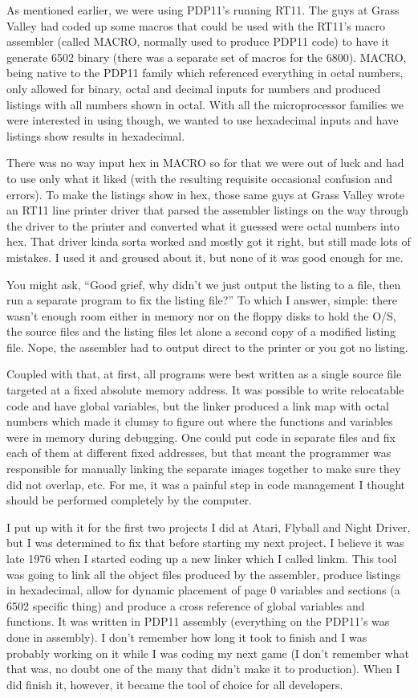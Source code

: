 As mentioned earlier, we were using PDP11's running RT11. The guys at Grass Valley had coded up some macros that could be used with the RT11's macro assembler (called MACRO, normally used to produce PDP11 code) to have it generate 6502 binary (there was a separate set of macros for the 6800). MACRO, being native to the PDP11 family which referenced everything in octal numbers, only allowed for binary, octal and decimal inputs for numbers and produced listings with all numbers shown in octal. With all the microprocessor families we were interested in using though, we wanted to use hexadecimal inputs and have listings show results in hexadecimal. 

There was no way input hex in MACRO so for that we were out of luck and had to use only what it liked (with the resulting requisite occasional confusion and errors). To make the listings show in hex, those same guys at Grass Valley wrote an RT11 line printer driver that parsed the assembler listings on the way through the driver to the printer and converted what it guessed were octal numbers into hex. That driver kinda sorta worked and mostly got it right, but still made lots of mistakes. I used it and groused about it, but none of it was good enough for me. 

You might ask, “Good grief, why didn't we just output the listing to a file, then run a separate program to fix the listing file?” To which I answer, simple: there wasn't enough room either in memory nor on the floppy disks to hold the O/S, the source files and the listing files let alone a second copy of a modified listing file. Nope, the assembler had to output direct to the printer or you got no listing. 

Coupled with that, at first, all programs were best written as a single source file targeted at a fixed absolute memory address. It was possible to write relocatable code and have global variables, but the linker produced a link map with octal numbers which made it clumsy to figure out where the functions and variables were in memory during debugging. One could put code in separate files and fix each of them at different fixed addresses, but that meant the programmer was responsible for manually linking the separate images together to make sure they did not overlap, etc. For me, it was a painful step in code management I thought should be performed completely by the computer.

I put up with it for the first two projects I did at Atari, Flyball and Night Driver, but I was determined to fix that before starting my next project. I believe it was late 1976 when I started coding up a new linker which I called linkm. This tool was going to link all the object files produced by the assembler, produce listings in hexadecimal, allow for dynamic placement of page 0 variables and sections (a 6502 specific thing) and produce a cross reference of global variables and functions. It was written in PDP11 assembly (everything on the PDP11's was done in assembly). I don't remember how long it took to finish and I was probably working on it while I was coding my next game (I don't remember what that was, no doubt one of the many that didn't make it to production). When I did finish it, however, it became the tool of choice for all developers.

